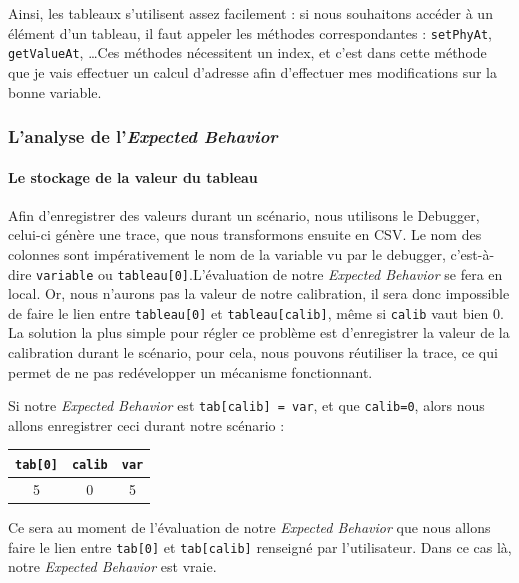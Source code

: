 Ainsi, les tableaux s'utilisent assez facilement : si nous souhaitons accéder à un élément d'un tableau, il faut appeler les méthodes correspondantes : \texttt{setPhyAt}, \texttt{getValueAt}, \ldots Ces méthodes nécessitent un index, et c'est dans cette méthode que je vais effectuer un calcul d'adresse afin d'effectuer mes modifications sur la bonne variable.


\subsubsection{L'analyse de l'\textit{Expected Behavior}}


\paragraph{Le stockage de la valeur du tableau} Afin d'enregistrer des valeurs durant un scénario, nous utilisons le Debugger, celui-ci génère une trace, que nous transformons ensuite en CSV. Le nom des colonnes sont impérativement le nom de la variable vu par le debugger, c'est-à-dire \texttt{variable} ou \texttt{tableau[0]}.\newline L'évaluation de notre \textit{Expected Behavior} se fera en local. Or, nous n'aurons pas la valeur de notre calibration, il sera donc impossible de faire le lien entre \texttt{tableau[0]} et \texttt{tableau[calib]}, même si \texttt{calib} vaut bien 0.\newline
La solution la plus simple pour régler ce problème est d'enregistrer la valeur de la calibration durant le scénario, pour cela, nous pouvons réutiliser la trace, ce qui permet de ne pas redévelopper un mécanisme fonctionnant. 
\begin{exemple}
Si notre \textit{Expected Behavior} est \texttt{tab[calib] = var}, et que \texttt{calib=0}, alors nous allons enregistrer ceci durant notre scénario : 

\begin{tabular}{ccc}
\texttt{tab[0]} & \texttt{calib} & \texttt{var}\\
\hline
5      &   0   & 5
\end{tabular}

Ce sera au moment de l'évaluation de notre \textit{Expected Behavior} que nous allons faire le lien entre \texttt{tab[0]} et \texttt{tab[calib]} renseigné par l'utilisateur. Dans ce cas là, notre \textit{Expected Behavior} est vraie.
\end{exemple}

